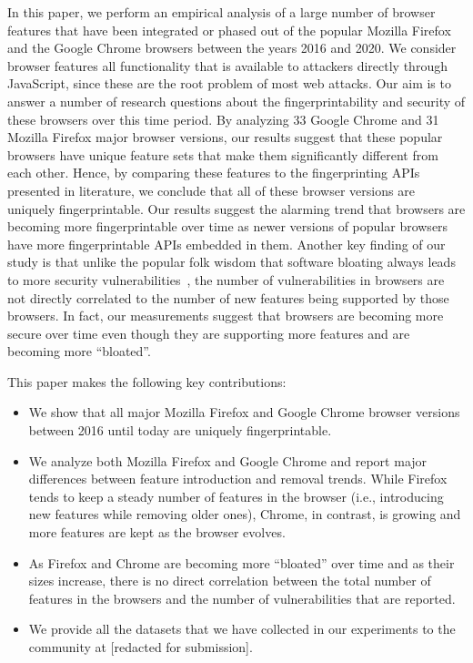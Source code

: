 In this paper, we perform an empirical analysis of a large number of
browser features that have been integrated or phased out of the
popular Mozilla Firefox and the Google Chrome browsers between the
years 2016 and 2020. We consider browser features all functionality that is available to attackers directly through JavaScript, since these are the root problem of most web attacks. Our aim is to answer a number of research
questions about the fingerprintability and security of these browsers
over this time period. By analyzing 33 Google Chrome and 31 Mozilla
Firefox major browser versions, our results suggest that these popular
browsers have unique feature sets that make them significantly
different from each other. Hence, by comparing these features to the
fingerprinting APIs presented in literature, we conclude that all of
these browser versions are uniquely fingerprintable. Our results suggest
the alarming trend that browsers are becoming more fingerprintable
over time as newer versions of popular browsers have more
fingerprintable APIs embedded in them. Another key finding of our
study is that unlike the popular folk wisdom that software bloating
always leads to more security vulnerabilities~\cite{Bloating}, the
number of vulnerabilities in browsers are not directly correlated to the
number of new features being supported by those browsers. In fact, our
measurements suggest that browsers are becoming more secure over time
even though they are supporting more features and are becoming more
``bloated''.

This paper makes the following key contributions:

\begin{itemize}

\item We show that all major Mozilla Firefox and Google Chrome browser
  versions between 2016 until today are uniquely fingerprintable.

\item We analyze both Mozilla Firefox and Google Chrome and report
  major differences between feature introduction and removal
  trends. While Firefox tends to keep a steady number of features in
  the browser (i.e., introducing new features while removing older
  ones), Chrome, in contrast, is growing and more features are kept as
  the browser evolves.

\item As Firefox and Chrome are becoming more ``bloated'' over time
  and as their sizes increase, there is no direct correlation between
  the total number of features in the browsers and the number of
  vulnerabilities that are reported.

\item We provide all the datasets that we have collected in our
  experiments to the community at [redacted for submission].
  
\end{itemize}

